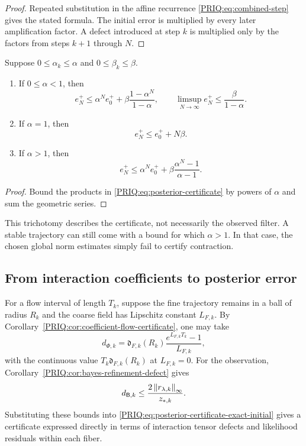 \begin{proof}
Repeated substitution in the affine recurrence \eqref{PRIQ:eq:combined-step} gives the stated formula.  The initial error is multiplied by every later amplification factor.  A defect introduced at step $k$ is multiplied only by the factors from steps $k+1$ through $N$.
\end{proof}

\begin{PRIQcorollary}\label{PRIQ:cor:filter-stability-regimes}
Suppose $0\leq\alpha_k\leq\alpha$ and $0\leq\beta_k\leq\beta$.

\begin{enumerate}[label=(\roman*),leftmargin=2.8em]
\item If $0\leq\alpha<1$, then
\begin{equation}\label{PRIQ:eq:stable-filter-bound}
  e_N^+
  \leq
  \alpha^Ne_0^+
  +
  \beta\frac{1-\alpha^N}{1-\alpha},
  \qquad
  \limsup_{N\to\infty}e_N^+
  \leq\frac{\beta}{1-\alpha}.
\end{equation}

\item If $\alpha=1$, then
\[
  e_N^+\leq e_0^++N\beta.
\]

\item If $\alpha>1$, then
\[
  e_N^+
  \leq
  \alpha^Ne_0^+
  +
  \beta\frac{\alpha^N-1}{\alpha-1}.
\]
\end{enumerate}
\end{PRIQcorollary}

\begin{proof}
Bound the products in \eqref{PRIQ:eq:posterior-certificate} by powers of $\alpha$ and sum the geometric series.
\end{proof}

This trichotomy describes the certificate, not necessarily the observed filter.  A stable trajectory can still come with a bound for which $\alpha>1$.  In that case, the chosen global norm estimates simply fail to certify contraction.

\subsection{From interaction coefficients to posterior error}
For a flow interval of length $T_k$, suppose the fine trajectory remains in a ball of radius $R_k$ and the coarse field has Lipschitz constant $L_{F,k}$.  By Corollary~\ref{PRIQ:cor:coefficient-flow-certificate}, one may take
\begin{equation}\label{PRIQ:eq:dphi-coefficient}
  d_{\Phi,k}
  =
  \mathfrak d_{F,k}(R_k)
  \frac{e^{L_{F,k}T_k}-1}{L_{F,k}},
\end{equation}
with the continuous value $T_k\mathfrak d_{F,k}(R_k)$ at $L_{F,k}=0$.
For the observation, Corollary~\ref{PRIQ:cor:bayes-refinement-defect} gives
\begin{equation}\label{PRIQ:eq:dbayes-coefficient}
  d_{\mathsf B,k}
  \leq
  \frac{2\left\lVert r_{\lambda,k}\right\rVert_{\infty}}{z_{*,k}}.
\end{equation}
Substituting these bounds into \eqref{PRIQ:eq:posterior-certificate-exact-initial} gives a certificate expressed directly in terms of interaction tensor defects and likelihood residuals within each fiber.

